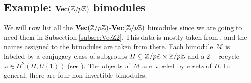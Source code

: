 
\subsection{Example: $\textbf{Vec}(\mathbb{Z}/p\mathbb{Z})$ bimodules}\label{sec:VecZp-bimodules}

We will now list all the $\textbf{Vec}(\mathbb{Z}/p\mathbb{Z})$-$\textbf{Vec}(\mathbb{Z}/p\mathbb{Z})$ bimodules since we are going to need them in Subsection \ref{subsec:VecZ2}. This data is mostly taken from \cite{BBJ19}, and the names assigned to the bimodules are taken from there. Each bimodule $\mathcal{M}$ is labeled by a conjugacy class of subgroups $H\subseteq\mathbb{Z}/p\mathbb{Z}\times\mathbb{Z}/p\mathbb{Z}$ and a $2-$cocycle $\omega\in H^2(H,U(1))$ (see \cite{Etingof2015}). The objects of $\mathcal{M}$ are labeled by cosets of $H$. In general, there are four non-invertible bimodules: 
